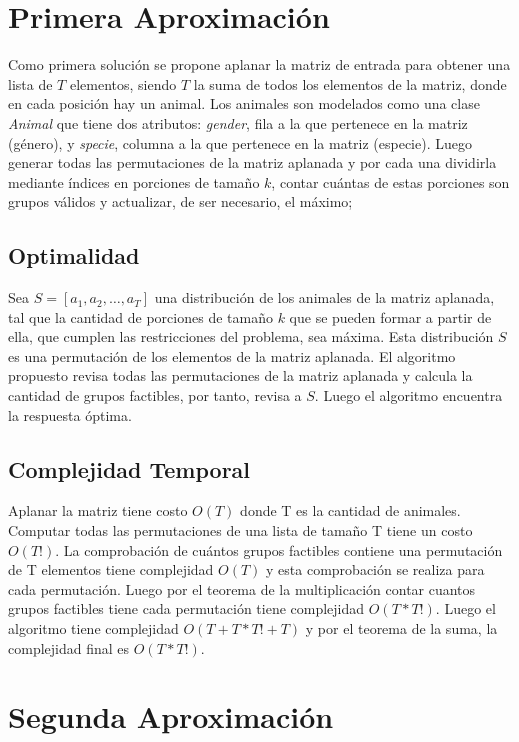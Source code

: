 \documentclass[article]{llncs}
\begin{document}
\section{Primera Aproximaci\'on}

Como primera soluci\'on se propone aplanar la matriz de entrada para 
obtener una lista de $T$ elementos, siendo $T$ la suma de todos los elementos de la matriz,
 donde en cada posici\'on hay un animal. 
Los animales son modelados como una clase \emph{Animal} que tiene dos 
atributos: \emph{gender}, fila a la que pertenece en la matriz (g\'enero),  
y \emph{specie}, columna a la que pertenece en la matriz (especie). Luego 
generar todas las permutaciones de la matriz aplanada y por cada una 
dividirla mediante \'indices en porciones de tamaño $k$, contar cu\'antas 
de estas porciones son grupos v\'alidos y actualizar, de ser necesario, el 
máximo;   

\subsection{Optimalidad}
Sea $S = [a_1, a_2, \dots, a_T]$ una distribución de los animales de la 
matriz aplanada, tal que la cantidad de porciones de tamaño $k$ que se pueden 
formar a partir de ella, que cumplen las restricciones del problema, sea máxima. 
Esta distribución $S$ es una permutación de los elementos de la matriz aplanada. 
El algoritmo propuesto revisa todas las permutaciones de la matriz aplanada y 
calcula la cantidad de grupos factibles, por tanto, revisa a $S$. Luego 
el algoritmo encuentra la respuesta óptima.

\subsection{Complejidad Temporal}

Aplanar la matriz tiene costo $O(T)$ donde T es la cantidad 
de animales. Computar todas las permutaciones de una lista 
de tamaño T tiene un costo $O(T!)$. La comprobación 
de cuántos grupos factibles contiene una permutación de T 
elementos tiene complejidad $O(T)$ y esta comprobación se realiza para cada permutación.
Luego por el teorema de la multiplicación contar cuantos grupos factibles tiene cada permutación 
tiene complejidad $O(T*T!)$. Luego el algoritmo 
tiene complejidad $O(T + T*T! + T)$ y por el teorema de la 
suma, la complejidad final es $O(T*T!)$.

\section{Segunda Aproximaci\'on}
\end{document}
